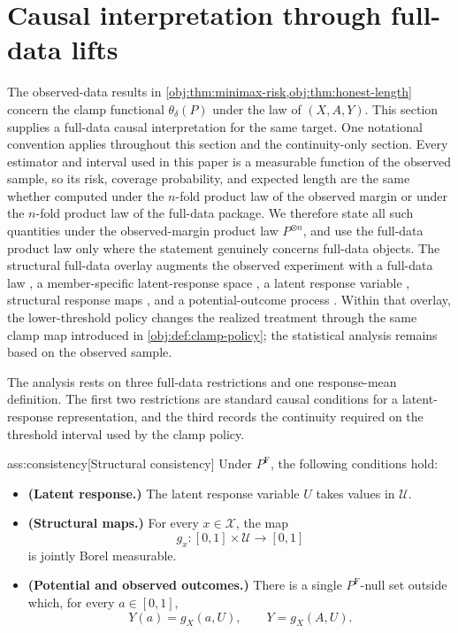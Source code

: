 \section{Causal interpretation through full-data lifts}
\label{sec:causal-interpretation}

The observed-data results in \cref{obj:thm:minimax-risk,obj:thm:honest-length} concern the clamp functional \(\theta_\delta(P)\) under the law of \((X,A,Y)\). This section supplies a full-data causal interpretation for the same target.  One notational convention applies throughout this section and the continuity-only section.  Every estimator and interval used in this paper is a measurable function of the observed sample, so its risk, coverage probability, and expected length are the same whether computed under the \(n\)-fold product law of the observed margin or under the \(n\)-fold product law of the full-data package.  We therefore state all such quantities under the observed-margin product law \(P^{\otimes n}\), and use the full-data product law only where the statement genuinely concerns full-data objects. The structural full-data overlay augments the observed experiment with a full-data law , a member-specific latent-response space , a latent response variable , structural response maps , and a potential-outcome process . Within that overlay, the lower-threshold policy changes the realized treatment through the same clamp map introduced in \cref{obj:def:clamp-policy}; the statistical analysis remains based on the observed sample.

The analysis rests on three full-data restrictions and one response-mean definition. The first two restrictions are standard causal conditions for a latent-response representation, and the third records the continuity required on the threshold interval used by the clamp policy.

\begin{assumptionv}{ass:consistency}[Structural consistency]
Under \(P^{\mathrm F}\), the following conditions hold:
\begin{itemize}
\item \textbf{(Latent response.)} The latent response variable \(U\) takes values in \(\mathcal U\).
\item \textbf{(Structural maps.)} For every \(x\in\mathcal X\), the map
\[
g_x:[0,1]\times\mathcal U\to[0,1]
\]
is jointly Borel measurable.
\item \textbf{(Potential and observed outcomes.)} There is a single \(P^{\mathrm F}\)-null set outside which, for every \(a\in[0,1]\),
\[
Y(a)=g_X(a,U),
\qquad
Y=g_X(A,U).
\]
\end{itemize}
\end{assumptionv}

